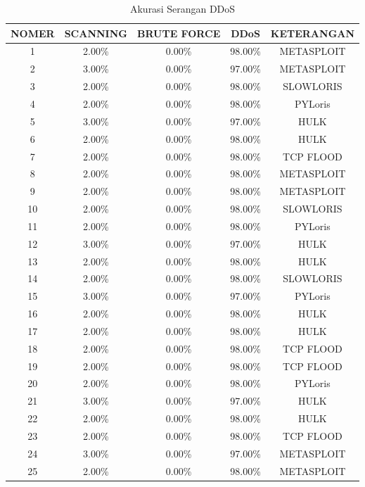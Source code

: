 \begin{table}[H]
	\centering
	\caption{Akurasi Serangan DDoS}
	\label{Akurasi Serangan DDoS}
	\begin{tabular}{|c|c|c|c|c|}
		\hline
		NOMER        & SCANNING & BRUTE FORCE & DDoS    & KETERANGAN \\ \hline
		1         & 2.00\%   & 0.00\%      & 98.00\% & METASPLOIT \\ \hline
		2         & 3.00\%   & 0.00\%      & 97.00\% & METASPLOIT \\ \hline
		3         & 2.00\%   & 0.00\%      & 98.00\% & SLOWLORIS  \\ \hline
		4         & 2.00\%   & 0.00\%      & 98.00\% & PYLoris    \\ \hline
		5         & 3.00\%   & 0.00\%      & 97.00\% & HULK       \\ \hline
		6         & 2.00\%   & 0.00\%      & 98.00\% & HULK       \\ \hline
		7         & 2.00\%   & 0.00\%      & 98.00\% & TCP FLOOD  \\ \hline
		8         & 2.00\%   & 0.00\%      & 98.00\% & METASPLOIT \\ \hline
		9         & 2.00\%   & 0.00\%      & 98.00\% & METASPLOIT \\ \hline
		10        & 2.00\%   & 0.00\%      & 98.00\% & SLOWLORIS  \\ \hline
		11        & 2.00\%   & 0.00\%      & 98.00\% & PYLoris    \\ \hline
		12        & 3.00\%   & 0.00\%      & 97.00\% & HULK       \\ \hline
		13        & 2.00\%   & 0.00\%      & 98.00\% & HULK       \\ \hline
		14        & 2.00\%   & 0.00\%      & 98.00\% & SLOWLORIS  \\ \hline
		15        & 3.00\%   & 0.00\%      & 97.00\% & PYLoris    \\ \hline
		16        & 2.00\%   & 0.00\%      & 98.00\% & HULK       \\ \hline
		17        & 2.00\%   & 0.00\%      & 98.00\% & HULK       \\ \hline
		18        & 2.00\%   & 0.00\%      & 98.00\% & TCP FLOOD  \\ \hline
		19        & 2.00\%   & 0.00\%      & 98.00\% & TCP FLOOD  \\ \hline
		20        & 2.00\%   & 0.00\%      & 98.00\% & PYLoris    \\ \hline
		21        & 3.00\%   & 0.00\%      & 97.00\% & HULK       \\ \hline
		22        & 2.00\%   & 0.00\%      & 98.00\% & HULK       \\ \hline
		23        & 2.00\%   & 0.00\%      & 98.00\% & TCP FLOOD  \\ \hline
		24        & 3.00\%   & 0.00\%      & 97.00\% & METASPLOIT \\ \hline
		25        & 2.00\%   & 0.00\%      & 98.00\% & METASPLOIT \\ \hline
			\end{tabular}
	\end{table}
